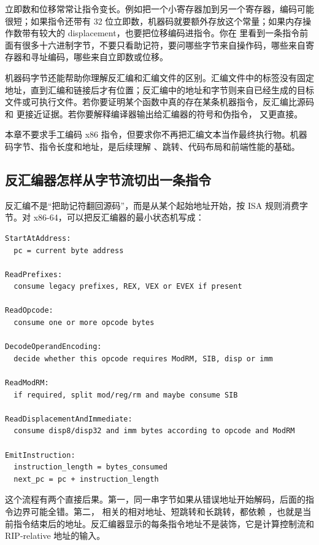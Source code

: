 立即数和位移常常让指令变长。例如把一个小寄存器加到另一个寄存器，编码可能很短；如果指令还带有 32 位立即数，机器码就要额外存放这个常量；如果内存操作数带有较大的 displacement，也要把位移编码进指令。你在  里看到一条指令前面有很多十六进制字节，不要只看助记符，要问哪些字节来自操作码，哪些来自寄存器和寻址编码，哪些来自立即数或位移。

机器码字节还能帮助你理解反汇编和汇编文件的区别。汇编文件中的标签没有固定地址，直到汇编和链接后才有位置；反汇编中的地址和字节则来自已经生成的目标文件或可执行文件。若你要证明某个函数中真的存在某条机器指令，反汇编比源码和  更接近证据。若你要解释编译器输出给汇编器的符号和伪指令， 又更直接。

\begin{deepdive}
本章不要求手工编码 x86 指令，但要求你不再把汇编文本当作最终执行物。机器码字节、指令长度和地址，是后续理解 、跳转、代码布局和前端性能的基础。
\end{deepdive}

\subsection{反汇编器怎样从字节流切出一条指令}

反汇编不是“把助记符翻回源码”，而是从某个起始地址开始，按 ISA 规则消费字节。对 x86-64，可以把反汇编器的最小状态机写成：

\begin{lstlisting}[numbers=none,caption={x86-64 反汇编的压缩状态机}]
StartAtAddress:
  pc = current byte address

ReadPrefixes:
  consume legacy prefixes, REX, VEX or EVEX if present

ReadOpcode:
  consume one or more opcode bytes

DecodeOperandEncoding:
  decide whether this opcode requires ModRM, SIB, disp or imm

ReadModRM:
  if required, split mod/reg/rm and maybe consume SIB

ReadDisplacementAndImmediate:
  consume disp8/disp32 and imm bytes according to opcode and ModRM

EmitInstruction:
  instruction_length = bytes_consumed
  next_pc = pc + instruction_length
\end{lstlisting}

这个流程有两个直接后果。第一，同一串字节如果从错误地址开始解码，后面的指令边界可能全错。第二， 相关的相对地址、短跳转和长跳转，都依赖 ，也就是当前指令结束后的地址。反汇编器显示的每条指令地址不是装饰，它是计算控制流和 RIP-relative 地址的输入。

